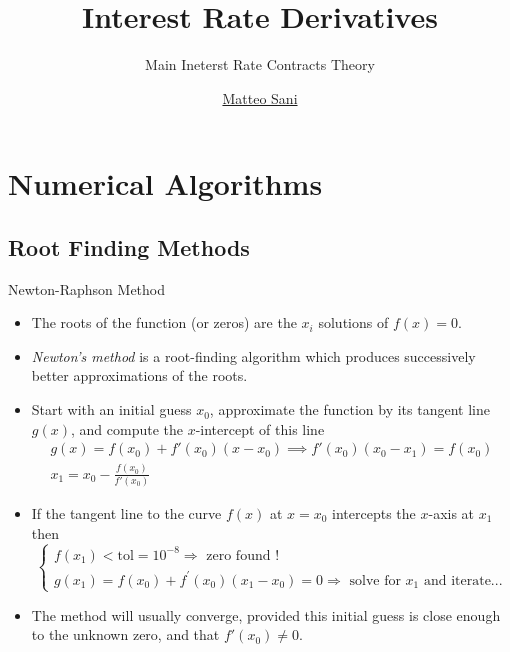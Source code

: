 \documentclass{beamer}
\title{Interest Rate Derivatives}
\subtitle{Main Ineterst Rate Contracts Theory}
\author{\href{mailto:matteo.sani@unisi.it}{Matteo Sani}}
\begin{document}
\begin{frame}[plain]
  \maketitle
\end{frame}

\section{Numerical Algorithms}
\subsection{Root Finding Methods}
\begin{frame}[fragile]{Newton-Raphson Method}
	\begin{itemize}
		\item The roots of the function (or zeros) are the $x_i$ solutions of $f(x) = 0$.
		\item \emph{Newton's method} is a root-finding algorithm which produces successively better approximations of the roots.
		\item Start with an initial guess $x_0$, approximate the function by its tangent line $g(x)$, and compute the $x$-intercept of this line
		\begin{gather*}
			g(x) = f(x_0) + f'(x_0)(x-x_0) \implies  f'(x_0)(x_0-x_1)=f(x_0)\\
			x_1=x_0-\frac {f(x_0)}{f'(x_0)}
		\end{gather*}
		\item If the tangent line to the curve $f(x)$ at $x = x_0$ intercepts the $x$-axis at $x_{1}$ then
		\begin{equation*}
			\begin{cases}
				f(x_1) < \text{tol}=10^{-8} \Rightarrow \text{ zero found !}\\
				g(x_1) = f(x_0) + f^{'}(x_0)(x_1-x_0) = 0 \Rightarrow \text{ solve for
				}x_1\text{ and iterate...}
			\end{cases}
		\end{equation*}
		\item The method will usually converge, provided this initial guess is close enough to the unknown zero, and that $f'(x_0) \neq 0$.
	\end{itemize}
\end{frame}
\end{document}
